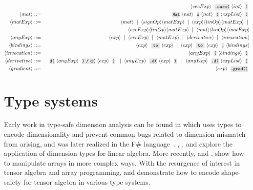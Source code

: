\documentclass[12pt,initial,twoside,maitrise]{dms}
\numberwithin{equation}{section}
\numberwithin{table}{chapter}
\numberwithin{figure}{chapter}
\begin{document}
\begin{eqnarray*}
&&\bnfrl{vecExp}\code{.norm(}\bnfrl{int}\code{)} \\
\bnfrl{mat} & ::= & \code{Mat} \bnfrl{nat} \code{x} \bnfrl{nat} \code{(} \bnfrl{expList} \code{)} \\
\bnfrl{matExp} & ::= & \bnfrl{mat} \mor \bnfrl{signOp}\bnfrl{matExp} \mor \bnfrl{exp}\bnfrl{linOp}\bnfrl{matExp} \mor \\
&&\bnfrl{vecExp}\bnfrl{linOp}\bnfrl{matExp} \mor \bnfrl{mat} \bnfrl{linOp} \bnfrl{matExp} \\
\bnfrl{anyExp} & ::= & \bnfrl{exp} \mor \bnfrl{vecExp} \mor \bnfrl{matExp} \mor \bnfrl{derivative} \mor \bnfrl{invocation} \\
\bnfrl{bindings} & ::= & \bnfrl{exp} \code{ to } \bnfrl{exp} \mor \bnfrl{exp} \code{ to } \bnfrl{exp} \code{,} \bnfrl{bindings} \\
\bnfrl{invocation} & ::= & \bnfrl{anyExp} \code{(} \bnfrl{bindings} \code{)} \\
\bnfrl{derivative} & ::= & \code{d(} \bnfrl{anyExp} \code{) / d(} \bnfrl{exp} \code{)} \mor \bnfrl{anyExp} \code{.d(} \bnfrl{exp} \code{)} \mor \bnfrl{anyExp} \code{.d(} \bnfrl{expList} \code{)} \\
\bnfrl{gradient} & ::= & \bnfrl{exp} \code{.grad()}
\end{eqnarray*}

\section{Type systems}\label{sec:type-systems}

Early work in type-safe dimension analysis can be found in \citet{kennedy1994dimension, kennedy1996programming} which uses types to encode dimensionality and prevent common bugs related to dimension mismatch from arising, and was later realized in the F\# language~\citep{kennedy2010types}. \citet{jay1996shape}, \citet{rittri1995dimension}, and \citet{zenger1997indexed} explore the application of dimension types for linear algebra. More recently, \citet{kiselyov2005number, kiselyov2010fun} and \citet{griffioen2015type}, show how to manipulate arrays in more complex ways. With the resurgence of interest in tensor algebra and array programming, \citet{chen2017typesafe} and \citet{rink2018modeling} demonstrate how to encode shape-safety for tensor algebra in various type systems.
\end{document}
